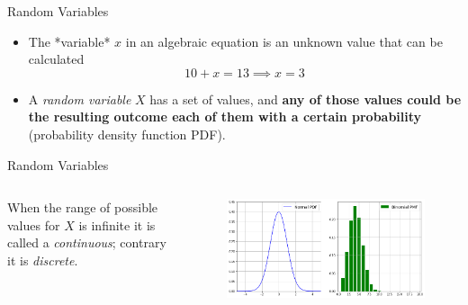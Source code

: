 \documentclass{beamer}
\begin{document}
\begin{frame}{Random Variables}
	\begin{itemize}
		\item The *variable* $x$ in an algebraic equation is an unknown value that can be calculated 
        \begin{equation*}
        10 + x = 13 \implies x=3
        \end{equation*}
        \item A \emph{random variable} $X$ has a set of values, and \textbf{any of those values could be the resulting outcome each of them with a certain probability} (probability density function PDF).
	\end{itemize}
\end{frame}

\begin{frame}{Random Variables}
    \begin{columns}
    When the range of possible values for $X$ is infinite it is called a \emph{continuous}; contrary it is \emph{discrete}.
    \begin{figure}[h]
    \begin{center}
    \includegraphics[width=1.0\linewidth]{rv_pdf}
    \end{center}
    \end{figure}    
    \end{columns}
\end{frame}
\end{document}
